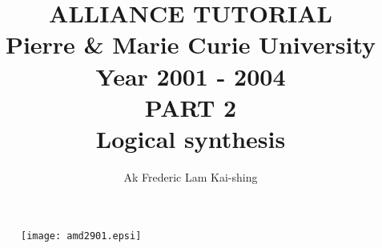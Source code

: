 \documentclass[12pt]{article}
\begin{document}
\title{
               {\Huge ALLIANCE TUTORIAL\\}
    {\large
               Pierre \& Marie Curie University \\
                  Year 2001 - 2004\\
    }
    \vspace{1cm}
    {\huge
                      PART 2\\
            Logical synthesis
    }
}
\date{}   
\author{
              Ak Frederic\hspace{2cm} Lam Kai-shing
}

\maketitle

\begin{figure}[H]\centering
  \texttt{[image: amd2901.epsi]}
\end{figure}

\begin{figure}
\end{figure}

\thispagestyle{empty}
\def\myfbox#1{\vspace*{3mm}\fbox{#1}\vspace{3mm}}
\end{document}
